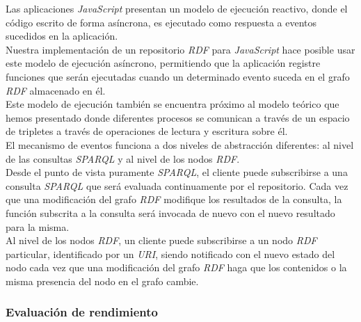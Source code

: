 Las aplicaciones \textit{JavaScript} presentan un modelo de ejecuci\'on reactivo, donde el c\'odigo escrito de forma as\'incrona, es ejecutado como respuesta a eventos sucedidos en la aplicaci\'on.\\
Nuestra implementaci\'on de un repositorio \textit{RDF} para \textit{JavaScript} hace posible usar este modelo de ejecuci\'on as\'incrono, permitiendo que la aplicaci\'on registre funciones que ser\'an ejecutadas cuando un determinado evento suceda en el grafo \textit{RDF} almacenado en \'el.\\
Este modelo de ejecuci\'on tambi\'en se encuentra pr\'oximo al modelo te\'orico que hemos presentado donde diferentes procesos se comunican a trav\'es de un espacio de tripletes a trav\'es de operaciones de lectura y escritura sobre \'el.\\
El mecanismo de eventos funciona a dos niveles de abstracci\'on diferentes: al nivel de las consultas \textit{SPARQL} y al nivel de los nodos \textit{RDF}.\\
Desde el punto de vista puramente \textit{SPARQL}, el cliente puede subscribirse a una consulta \textit{SPARQL} que ser\'a evaluada continuamente por el repositorio. Cada vez que una modificaci\'on del grafo \textit{RDF} modifique los resultados de la consulta, la funci\'on subscrita a la consulta ser\'a invocada de nuevo con el nuevo resultado para la misma.\\
Al nivel de los nodos \textit{RDF}, un cliente puede subscribirse a un nodo \textit{RDF} particular, identificado por un \textit{URI}, siendo notificado con el nuevo estado del nodo cada vez que una modificaci\'on del grafo \textit{RDF} haga que los contenidos o la misma presencia del nodo en el grafo cambie.

\subsubsection{Evaluaci\'on de rendimiento}

